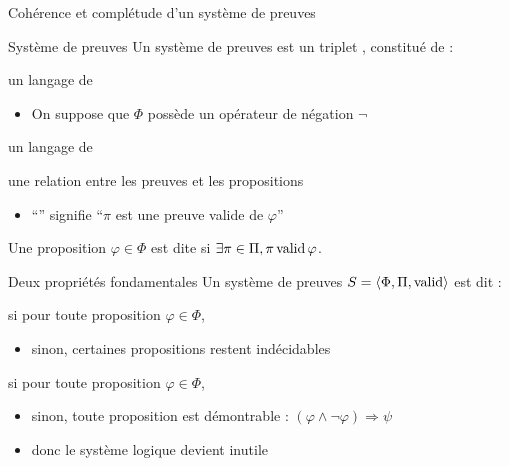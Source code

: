 
\begingroup

\begin{frame}{Cohérence et complétude d'un système de preuves}

  \begin{block}{Système de preuves}
    Un système de preuves est un triplet , constitué de :
    \begin{description}[Complétude :]
    \item[$\Phi\in\textsc{lang}$ :] un langage de  \hspace{\fill} 
      \begin{itemize}
      \item On suppose que $\Phi$ possède un opérateur de négation $\lnot$
      \end{itemize}
      \item[$\Pi\in\textsc{lang}$ :] un langage de  \hspace{\fill} 
      \item[$\valid \subseteq \Pi \times \Phi$ :] une relation entre les preuves et les propositions
      \begin{itemize}
      \item ``\structure{$\pi \valid \varphi$}'' signifie ``$\pi$ est une preuve valide de $\varphi$''
      \end{itemize}
    \end{description}
    Une proposition $\varphi \in \Phi$ est dite  si \alert{$\exists \pi\in \Pi, \pi\operatorname{valid}\varphi$}.
  \end{block}

  \pause
  \begin{block}{Deux propriétés fondamentales}
    Un système de preuves $S=\langle \Phi,\Pi,\operatorname{valid}\rangle$ est dit :
    \begin{description}[Complétude :]
    \item[Complet] si pour toute proposition $\varphi \in \Phi$, 
      \begin{itemize}
      \item sinon, \alert{certaines propositions restent indécidables}
      \end{itemize}
    \item[Cohérent] si pour toute proposition $\varphi \in \Phi$, 
      \begin{itemize}
      \item sinon, \alert{toute proposition est démontrable} : $(\varphi\land \lnot \varphi) \Rightarrow \psi$
      \item donc le système logique devient inutile
      \end{itemize}
    \end{description}
  \end{block}

\end{frame}

\endgroup
\endinput
